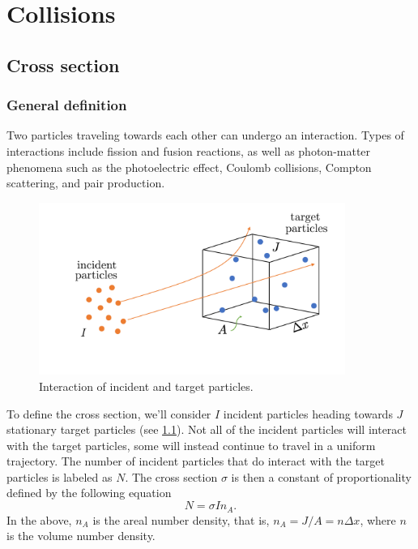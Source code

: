\documentclass[a4paper,11pt]{report}
\begin{document}
\chapter{Collisions}
\section{Cross section}
\subsection{General definition}
Two particles traveling towards each other can undergo an interaction. Types of interactions include fission and fusion reactions, as well as photon-matter phenomena such as the photoelectric effect, Coulomb collisions, Compton scattering, and pair production.

\begin{figure}[ht]
    \centering
    \includegraphics[width=10cm]{../../images/cross_section.pdf}
    \caption{Interaction of incident and target particles.}
    \label{fig:cross_many_particles}
\end{figure}
To define the cross section, we'll consider $I$ incident particles heading towards $J$ stationary target particles (see \cref{fig:cross_many_particles}). Not all of the incident particles will interact with the target particles, some will instead continue to travel in a uniform trajectory. The number of incident particles that do interact with the target particles is labeled as $N$. The cross section $\sigma$ is then a constant of proportionality defined by the following equation
\begin{equation}
    \label{eq:cross_def}
    N = \sigma I n_A.
\end{equation}
In the above, $n_A$ is the areal number density, that is, $n_A = J / A = n \Delta x$, where $n$ is the volume number density.
\end{document}
